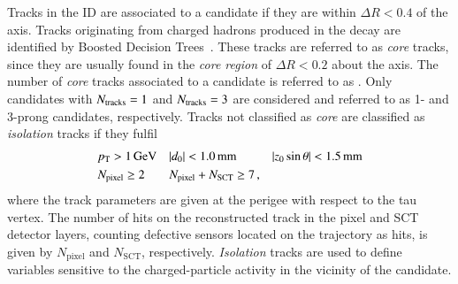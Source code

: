 Tracks in the ID are associated to a \tauhadvis candidate if they are within
$\Delta R < 0.4$ of the \tauhadvis axis. Tracks originating from charged hadrons
produced in the \taulepton decay are identified by Boosted Decision
Trees~\cite{duschinger}. These tracks are referred to as \emph{core} tracks,
since they are usually found in the \emph{core region} of $\Delta R < 0.2$ about
the \tauhadvis axis. The number of \emph{core} tracks associated to a \tauhadvis
candidate is referred to as \Ntracks. Only candidates with $N_{\text{tracks}} = 1$ and
$N_{\text{tracks}} = 3$ are considered and referred to as 1- and 3-prong \tauhadvis
candidates, respectively. Tracks not
classified as \emph{core} are classified as \emph{isolation} tracks if they
fulfil
\begin{align*}
  & p_{\text{T}} > \SI{1}{\ensuremath{\text{GeV}}} && |d_{0}| < \SI{1.0}{\milli\metre} && |z_{0} \sin\theta| < \SI{1.5}{\milli\metre} \\
  & N_{\text{pixel}} \geq 2 && N_{\text{pixel}} + N_{\text{SCT}} \geq 7 \,\text{,}
\end{align*}
where the track parameters are given at the perigee with respect to the tau
vertex. The number of hits on the reconstructed track in the pixel and SCT
detector layers, counting defective sensors located on the trajectory as hits,
is given by $N_{\text{pixel}}$ and $N_{\text{SCT}}$,
respectively. \emph{Isolation} tracks are used to define variables sensitive to
the charged-particle activity in the vicinity of the \tauhadvis candidate.

